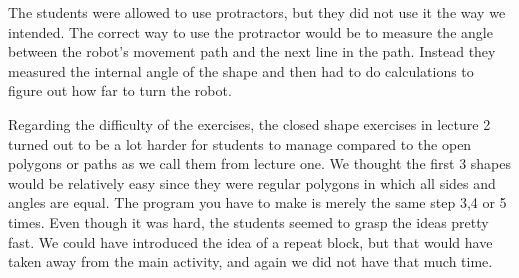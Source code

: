 \bigskip\noindent
The students were allowed to use protractors, but they did not use it the way we intended. The correct way to use the protractor would be to measure the angle between the robot's movement path and the next line in the path. Instead they measured the internal angle of the shape and then had to do calculations to figure out how far to turn the robot.

\bigskip\noindent
Regarding the difficulty of the exercises, the closed shape exercises in lecture 2 turned out to be a lot harder for students to manage compared to the open polygons or paths as we call them from lecture one. We thought the first 3 shapes would be relatively easy since they were regular polygons in which all sides and angles are equal. The program you have to make is merely the same step 3,4 or 5 times. Even though it was hard, the students seemed to grasp the ideas pretty fast. We could have introduced the idea of a repeat block, but that would have taken away from the main activity, and again we did not have that much time.
